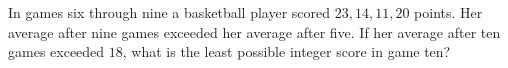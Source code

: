 In games six through nine a basketball player scored $23,14,11,20$ points. Her average after nine games exceeded her average after five. If her average after ten games exceeded $18$, what is the least possible integer score in game ten?
